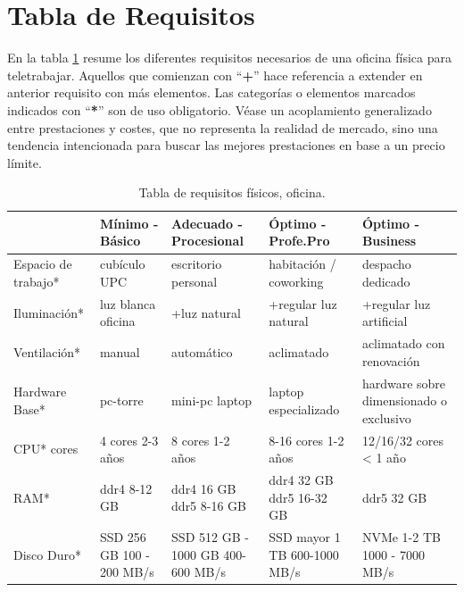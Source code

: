 \section{Tabla de Requisitos}
 En la tabla \ref{T:tabla_requisitos} resume los diferentes requisitos necesarios de una oficina física para teletrabajar. Aquellos que comienzan con “\textbf{+}” hace referencia a extender en anterior requisito con más elementos. Las categorías o elementos marcados indicados con “\textbf{*}” son de uso obligatorio. Véase un acoplamiento generalizado entre prestaciones y costes, que no representa la realidad de mercado, sino una tendencia intencionada para buscar las mejores prestaciones en base a un precio límite. 
\begin{table}[!htbp]
\begin{center}
   
    \caption{Tabla de requisitos físicos, oficina.}
\resizebox{15cm}{!} {
 \label{T:tabla_requisitos}
    \begin{tabular}{|p{3.5cm}|p{3cm}|p{3cm}|p{3cm}|p{3cm}|}    
    \hline    
        ~ & {\bf Mínimo - Básico} &  {\bf Adecuado - Procesional} & {\bf Óptimo - Profe.Pro} & {\bf Óptimo - Business}  \\ \hline
        
        Espacio de trabajo* & cubículo UPC & escritorio personal  & habitación / coworking & despacho dedicado \\ \hline
        
        Iluminación* & luz blanca oficina & +luz natural & +regular luz natural & +regular luz artificial  \\ \hline
        
        Ventilación* & manual & automático & aclimatado & aclimatado con renovación \\ \hline
        
        Hardware Base* & pc-torre & mini-pc laptop & laptop especializado & hardware sobre dimensionado o exclusivo \\ \hline
                
        CPU* cores & 4 cores 2-3 años & 8 cores 1-2 años & 8-16 cores 1-2 años & 12/16/32 cores  < 1 año  \\ \hline
        
        RAM* & ddr4 8-12 GB & ddr4 16 GB ddr5 8-16 GB & ddr4 32 GB ddr5 16-32 GB & ddr5 32 GB \\ \hline

        Disco Duro* & SSD 256 GB 100 - 200 MB/s  & SSD 512 GB - 1000 GB 400-600 MB/s & SSD mayor 1 TB 600-1000 MB/s & NVMe 1-2 TB 1000 - 7000 MB/s \\ \hline


\end{tabular}}
\end{center}
\end{table}
